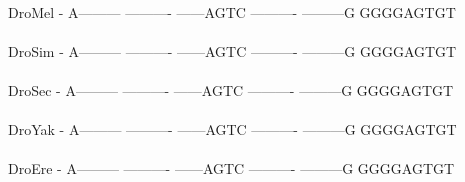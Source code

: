 \documentclass[11pt,twoside,reqno,a4paper]{article}
\begin{document}
{\\
DroMel	-	A---------	----------	------AGTC	----------	---------G	GGGGAGTGT\\
\hspace*{7\charwidth}\hspace*{1\charwidth}\hspace*{1\charwidth}\hspace*{1\charwidth}\hspace*{1\charwidth}\hspace*{1\charwidth}\hspace*{1\charwidth}\\
DroSim	-	A---------	----------	------AGTC	----------	---------G	GGGGAGTGT\\
\hspace*{7\charwidth}\hspace*{1\charwidth}\hspace*{1\charwidth}\hspace*{1\charwidth}\hspace*{1\charwidth}\hspace*{1\charwidth}\hspace*{1\charwidth}\\
DroSec	-	A---------	----------	------AGTC	----------	---------G	GGGGAGTGT\\
\hspace*{7\charwidth}\hspace*{1\charwidth}\hspace*{1\charwidth}\hspace*{1\charwidth}\hspace*{1\charwidth}\hspace*{1\charwidth}\hspace*{1\charwidth}\\
DroYak	-	A---------	----------	------AGTC	----------	---------G	GGGGAGTGT\\
\hspace*{7\charwidth}\hspace*{1\charwidth}\hspace*{1\charwidth}\hspace*{1\charwidth}\hspace*{1\charwidth}\hspace*{1\charwidth}\hspace*{1\charwidth}\\
DroEre	-	A---------	----------	------AGTC	----------	---------G	GGGGAGTGT\\
\hspace*{7\charwidth}\hspace*{1\charwidth}\hspace*{1\charwidth}\hspace*{1\charwidth}\hspace*{1\charwidth}\hspace*{1\charwidth}\hspace*{1\charwidth}\\
}
\end{document}
